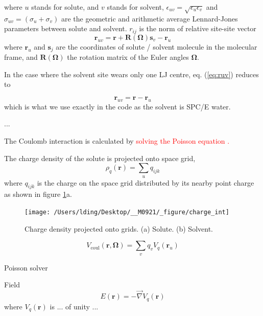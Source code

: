 where $u$ stands for solute, and $v$ stands for solvent, $\epsilon_{uv}=\sqrt{\epsilon_{u}\epsilon_{v}}$
and $\sigma_{uv}=\left(\sigma_{u}+\sigma_{v}\right)$ are the geometric
and arithmetic average Lennard-Jones parameters between solute and
solvent. $r_{ij}$ is the norm of relative site-site vector
\begin{equation}
\mathbf{r}_{uv}=\mathbf{r}+\mathbf{R}(\mathbf{\Omega})\mathbf{s}_{v}-\mathbf{r}_{u}\label{eq:ruv}
\end{equation}
where $\mathbf{r}_{u}$ and $\mathbf{s}_{j}$ are the coordinates
of solute / solvent molecule in the molecular frame, and $\mathbf{R}(\mathbf{\Omega})$
the rotation matrix of the Euler angles $\mathbf{\Omega}$.

In the case where the solvent site wears only one LJ centre, eq. (\ref{eq:ruv})
reduces to

\begin{equation}
\mathbf{r}_{uv}=\mathbf{r}-\mathbf{r}_{u}
\end{equation}
which is what we use exactly in the code as the solvent is SPC/E water.

...

The Coulomb interaction is calculated by \textcolor{red}{solving the
Poisson equation \citep{Marchi_2001}.}

The charge density of the solute is projected onto space grid,
\begin{equation}
\rho_{q}(\mathbf{r})=\sum_{u}q_{ijk}
\end{equation}
where $q_{ijk}$ is the charge on the space grid distributed by its
nearby point charge as shown in figure \ref{fig:Charge-density-projected}a.

\begin{figure}[h]
\begin{centering}
\texttt{[image: /Users/lding/Desktop/\_\_M0921/\_figure/charge\_int]}
\par\end{centering}

\caption{Charge density projected onto grids\label{fig:Charge-density-projected}.
(a) Solute. (b) Solvent.}
\end{figure}


\begin{equation}
V_{\mathrm{coul}}(\mathbf{r},\mathbf{\Omega})=\sum_{v}q_{v}V_{q}(\mathbf{r}_{u})
\end{equation}


Poisson solver

Field 
\begin{equation}
E(\mathbf{r})=-\overrightarrow{\nabla}V_{q}(\mathbf{r})
\end{equation}
where $V_{q}(\mathbf{r})$ is ... of unity ...

